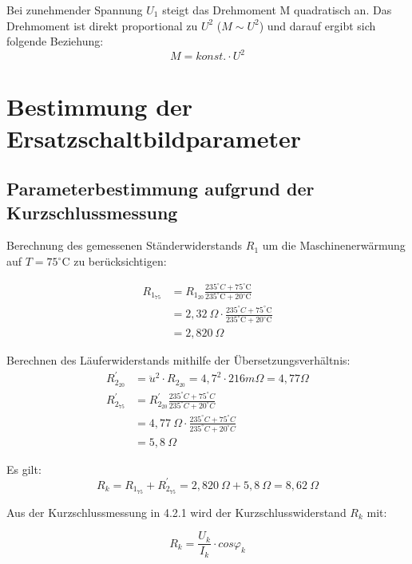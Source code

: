 \documentclass[conference]{IEEEtran}
\begin{document}
Bei zunehmender Spannung $U_1$ steigt das Drehmoment M quadratisch an. Das
Drehmoment ist direkt proportional zu $U^2$ ($M \sim U^2$) und darauf ergibt
sich folgende Beziehung: \[ M = \textit{konst.} \cdot U^{2} \]


\section{Bestimmung der Ersatzschaltbildparameter}
\subsection{Parameterbestimmung aufgrund der Kurzschlussmessung}

Berechnung des gemessenen Ständerwiderstands $R_{1}$ um die Maschinenerwärmung
auf $T=75^\circ$C zu berücksichtigen:

\begin{align}
    R_{1_{75}} & = R_{1_{20}}\frac{235^\circ\si{C}+75^\circ\text{C}}{235^\circ\text{C}+20^\circ\text{C}}         \\
               & = 2,32\ \Omega\cdot \frac{235^\circ\si{C}+75^\circ\text{C}}{235^\circ\text{C}+20^\circ\text{C}} \\
    \label{eq:R1_75}
               & = 2,820\ \Omega
\end{align}

Berechnen des Läuferwiderstands mithilfe der Übersetzungsverhältnis:
\begin{align}
    R_{2_{20}}^\prime & = \ddot{u}^2\cdot R_{2_{20}} = 4,7^2 \cdot 216\si{m\Omega}   = 4,77 \Omega                \\
    R_{2_{75}}^\prime & = R_{2_{20}}^\prime \frac{235^\circ\si{C}+75^\circ\si{C}}{235^\circ\si{C}+20^\circ\si{C}} \\
                      & = 4,77\ \Omega\cdot \frac{235^\circ\si{C}+75^\circ\si{C}}{235^\circ\si{C}+20^\circ\si{C}} \\
    \label{eq:R_2^prime}
                      & = 5,8\ \Omega
\end{align}

Es gilt:
\begin{equation} \label{eq:Kurzschlusswiderstand_gemessen}
    \boxed{R_k = R_{1_{75}} + R_{2_{75}}^\prime = 2,820\ \Omega + 5,8\ \Omega = 8,62\ \Omega}
\end{equation}

Aus der Kurzschlussmessung in 4.2.1 wird der Kurzschlusswiderstand $R_k$ mit:

\begin{equation} \label{eq:Kurzschlusswiderstand}
    \boxed{R_k = \frac{U_k}{I_k}\cdot cos\varphi_k}
\end{equation}
\end{document}
